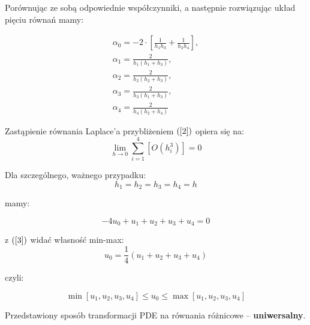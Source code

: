 \begin{frame}
  Porównując ze sobą odpowiednie współczynniki, a następnie rozwiązując układ pięciu równań mamy:
  \begin{block}{}
    $$ \begin{array}{l}
    \alpha_0 = -2 \cdot \left[ \frac{1}{h_1 h_3} + \frac{1}{h_2 h_4} \right], \\
    \alpha_1 = \frac{2}{h_1 (h_1 + h_3)}, \\
    \alpha_2 = \frac{2}{h_2 (h_2 + h_3)}, \\
    \alpha_3 = \frac{2}{h_3 (h_1 + h_3)}, \\
    \alpha_4 = \frac{2}{h_4 (h_2 + h_4)}
    \end{array}$$
  \end{block}

  Zastąpienie równania Laplace'a przybliżeniem $(\ref{2})$ opiera się na:
  $$ \lim_{h \rightarrow 0} \sum_{i=1}^4 [O(h_i^3)] = 0$$
\end{frame}

\begin{frame}
  Dla szczególnego, ważnego przypadku:
  $$ h_1 = h_2 = h_3 = h_4 = h $$

  mamy:

  \begin{equation} \label{3} -4 u_0 + u_1 + u_2 + u_3 + u_4 = 0 \end{equation}

  z $(\ref{3})$ widać własność min-max:
  $$ u_0 = \frac{1}{4} (u_1 + u_2 + u_3 + u_4) $$

  czyli:
  \begin{block}{}
    $$ \min[u_1, u_2, u_3, u_4] \le u_0 \le \max[u_1, u_2, u_3, u_4] $$
  \end{block}

  Przedstawiony sposób transformacji PDE na równania różnicowe -- \textbf{uniwersalny}.
\end{frame}
